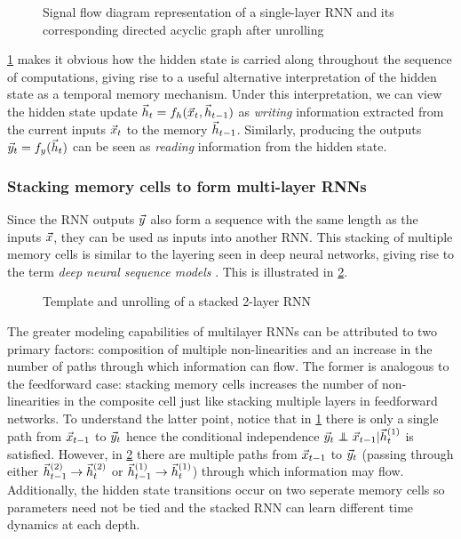 \begin{figure}[htpb]
  \centering
  \resizebox{4.5in}{!}{}
  \caption{Signal flow diagram representation of a single-layer RNN and its
  corresponding directed acyclic graph after unrolling}
  \label{fig:rnn-single-unrolled}
\end{figure}

\cref{fig:rnn-single-unrolled} makes it obvious how the hidden state is
carried along throughout the sequence of computations, giving rise to a useful
alternative interpretation of the hidden state as a temporal memory mechanism.
Under this interpretation, we can view the hidden state update $\vec{h}_t = f_h
(\vec{x}_t, \vec{h}_{t-1})$ as \emph{writing} information extracted from the
current inputs $\vec{x}_t$ to the memory $\vec{h}_{t-1}$. Similarly, producing
the outputs $\vec{y}_t = f_y (\vec{h}_t)$ can be seen as \emph{reading}
information from the hidden state.


\subsubsection{Stacking memory cells to form multi-layer RNNs}

Since the RNN outputs $\vec{y}$ also form a sequence with the same length as
the inputs $\vec{x}$, they can be used as inputs into another RNN. This
stacking of multiple memory cells is similar to the layering seen in deep
neural networks, giving rise to the term \emph{deep neural sequence models}
. This is illustrated in \cref{fig:rnn-multi-unrolled}.

\begin{figure}[htpb]
    \centering
    \resizebox{4.5in}{!}{}
    \caption{Template and unrolling of a stacked 2-layer RNN}
    \label{fig:rnn-multi-unrolled}
\end{figure}

The greater modeling capabilities of multilayer RNNs can be attributed to two
primary factors: composition of multiple non-linearities and an increase in the
number of paths through which information can flow. The former is analogous to
the feedforward case: stacking memory cells increases the number of
non-linearities in the composite cell just like stacking multiple layers in
feedforward networks. To understand the latter point, notice that in
\cref{fig:rnn-single-unrolled} there is only a single path from
$\vec{x}_{t-1}$ to $\vec{y}_{t}$ hence the conditional independence
$\y_{t} \independent \x_{t-1} | \h^{(1)}_t$ is satisfied.
However, in \cref{fig:rnn-multi-unrolled} there are multiple paths from
$\vec{x}_{t-1}$ to $\vec{y}_{t}$ (\eg passing through either
$\vec{h}^{(2)}_{t-1} \to \vec{h}^{(2)}_t$ or $\vec{h}^{(1)}_{t-1} \to
\vec{h}^{(1)}_t$) through which information may flow. Additionally, the
hidden state transitions occur on two seperate memory cells so parameters
need not be tied and the stacked RNN can learn different time dynamics
at each depth.

